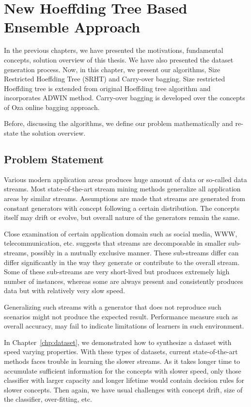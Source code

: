 \chapter{New Hoeffding Tree Based Ensemble Approach}
\label{chp:algo}
In the previous chapters, we have presented the motivations, fundamental concepts, solution overview of this thesis. We have also presented the dataset generation process. Now, in this chapter, we present our algorithms, Size Restricted Hoeffding Tree (SRHT) and Carry-over bagging. Size restricted Hoeffding tree is extended from original Hoeffding tree algorithm and incorporates ADWIN method. Carry-over bagging is developed over the concepts of Oza online bagging approach.

Before, discussing the algorithms, we define our problem mathematically and re-state the solution overview. 

\section{Problem Statement}
Various modern application areas produces huge amount of data or so-called data streams. Most state-of-the-art stream mining methods generalize all application areas by similar streams. Assumptions are made that streams are generated from constant generators with concept following a certain distribution. The concepts itself may drift or evolve, but overall nature of the generators remain the same.

Close examination of certain application domain such as social media, WWW, telecommunication, etc. suggests that streams are decomposable in smaller sub-streams, possibly in a mutually exclusive manner. These sub-streams differ can differ significantly in the way they generate or contribute to the overall stream. Some of these sub-streams are very short-lived but produces extremely high number of instances, whereas some are always present and consistently produces data but with relatively very slow speed.

Generalizing such streams with a generator that does not reproduce such scenarios might not produce the expected result. Performance measure such as overall accuracy, may fail to indicate limitations of learners in such environment.

In Chapter~\ref{chp:dataset}, we demonstrated how to synthesize a dataset with speed varying properties. With these types of datasets, current state-of-the-art methods faces trouble in learning the slower streams. As it takes longer time to accumulate sufficient information for the concepts with slower speed, only those classifier with larger capacity and longer lifetime would contain decision rules for slower concepts. Then again, we have usual challenges with concept drift, size of the classifier, over-fitting, etc.


